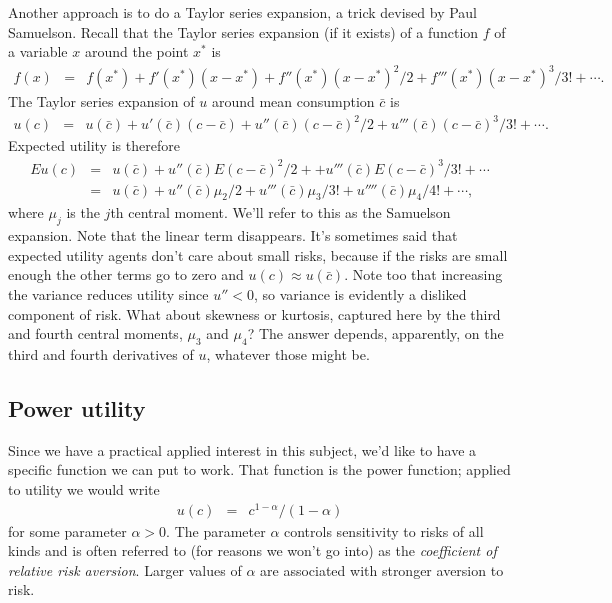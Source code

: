 \documentclass[11pt]{article}
\newcommand{\cbar}{\bar{c}}
\begin{document}
Another approach is to do a Taylor series expansion,
a trick devised by Paul Samuelson.
Recall that the Taylor series expansion (if it exists) of a
function $f$ of a variable $x$ around the point $x^*$ is
\begin{eqnarray*}
    f(x) &=& f(x^*) + f'(x^*) (x-x^*) + f''(x^*) (x-x^*)^2/2 +
        f'''(x^*) (x-x^*)^3/3! + \cdots .
\end{eqnarray*}
The Taylor series expansion of $u$ around mean consumption $\cbar$
is
\begin{eqnarray*}
    u(c) &=& u(\cbar) + u'(\cbar) (c-\cbar)  + u''(\cbar) (c-\cbar)^2/2
        + u'''(\cbar) (c-\cbar)^3/3! + \cdots .
\end{eqnarray*}
Expected utility is therefore
\begin{eqnarray*}
  E u(c) &=& u(\cbar) + u''(\cbar) E (c-\cbar)^2/2 +
        + u'''(\cbar) E (c-\cbar)^3/3! + \cdots \nonumber \\
        &=& u(\cbar) + u''(\cbar) \mu_2/2
            + u'''(\cbar) \mu_3 /3! + u''''(\cbar) \mu_4 /4! + \cdots ,
        \label{eq:eu-samuelson}
\end{eqnarray*}
where $\mu_j$ is the $j$th central moment.
We'll refer to this as the Samuelson expansion.
Note that the linear term disappears.
It's sometimes said that expected utility agents
don't care about small risks, because if the risks are small enough
the other terms go to zero and $u(c) \approx u(\cbar)$.
Note too that increasing the variance reduces
utility since $u'' < 0$,
so variance is evidently a disliked component of risk.
What about skewness or kurtosis, captured here by the third
and fourth central moments, $\mu_3$ and $\mu_4$?
The answer depends, apparently,
on the third and fourth derivatives of $u$,
whatever those might be.


\subsection*{Power utility}

Since we have a practical applied interest in this subject,
we'd like to have a specific function we can put to work.
That function is the power function;
applied to utility we would write
\begin{eqnarray}
    u(c) &=& c^{1-\alpha}/(1-\alpha)
\end{eqnarray}
for some parameter $\alpha > 0$.
The parameter $\alpha$ controls sensitivity to risks of all kinds
and is often referred to (for reasons we won't go into)
as the {\it coefficient of relative risk aversion\/}.
Larger values of $\alpha$ are associated with stronger aversion to risk.
\end{document}
